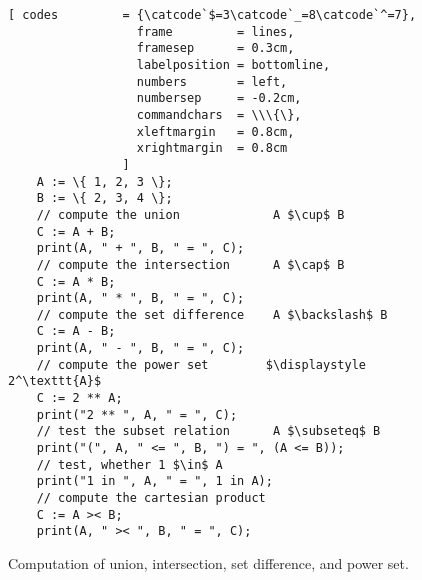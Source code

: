 \begin{figure}[!ht]
  \centering
\begin{Verbatim}[ codes         = {\catcode`$=3\catcode`_=8\catcode`^=7},
                  frame         = lines, 
                  framesep      = 0.3cm, 
                  labelposition = bottomline,
                  numbers       = left,
                  numbersep     = -0.2cm,
                  commandchars  = \\\{\},
                  xleftmargin   = 0.8cm,
                  xrightmargin  = 0.8cm
                ]
    A := \{ 1, 2, 3 \};
    B := \{ 2, 3, 4 \};
    // compute the union             A $\cup$ B 
    C := A + B;
    print(A, " + ", B, " = ", C);
    // compute the intersection      A $\cap$ B
    C := A * B;
    print(A, " * ", B, " = ", C);
    // compute the set difference    A $\backslash$ B
    C := A - B;
    print(A, " - ", B, " = ", C);
    // compute the power set        $\displaystyle 2^\texttt{A}$
    C := 2 ** A;
    print("2 ** ", A, " = ", C);
    // test the subset relation      A $\subseteq$ B
    print("(", A, " <= ", B, ") = ", (A <= B)); 
    // test, whether 1 $\in$ A
    print("1 in ", A, " = ", 1 in A);
    // compute the cartesian product
    C := A >< B;
    print(A, " >< ", B, " = ", C);
\end{Verbatim} 
\vspace*{-0.3cm}
\caption{Computation of union, intersection, set difference, and power set.}
  \label{fig:simple.stlx}
\end{figure} %

